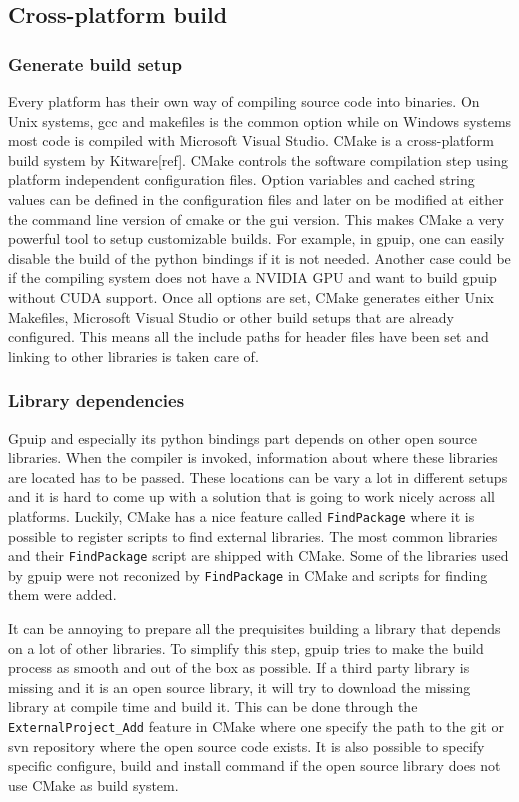 \subsection{Cross-platform build}
\subsubsection{Generate build setup}
Every platform has their own way of compiling source code into binaries. On Unix systems, gcc and makefiles is the common option while on Windows systems most code is compiled with Microsoft Visual Studio. CMake is a cross-platform build system by Kitware[ref]. CMake controls the software compilation step using platform independent configuration files. Option variables and cached string values can be defined in the configuration files and later on be modified at either the command line version of cmake or the gui version. This makes CMake a very powerful tool to setup customizable builds. For example, in gpuip, one can easily disable the build of the python bindings if it is not needed. Another case could be if the compiling system does not have a NVIDIA GPU and want to build gpuip without CUDA support. Once all options are set, CMake generates either Unix Makefiles, Microsoft Visual Studio or other build setups that are already configured. This means all the include paths for header files have been set and linking to other libraries is taken care of.

\subsubsection{Library dependencies}
Gpuip and especially its python bindings part depends on other open source libraries. When the compiler is invoked, information about where these libraries are located has to be passed. These locations can be vary a lot in different setups and it is hard to come up with a solution that is going to work nicely across all platforms. Luckily, CMake has a nice feature called {\tt FindPackage} where it is possible to register scripts to find external libraries. The most common libraries and their {\tt FindPackage} script are shipped with CMake. Some of the libraries used by gpuip were not reconized by {\tt FindPackage} in CMake and scripts for finding them were added.
\newline

It can be annoying to prepare all the prequisites building a library that depends on a lot of other libraries. To simplify this step, gpuip tries to make the build process as smooth and out of the box as possible. If a third party library is missing and it is an open source library, it will try to download the missing library at compile time and build it. This can be done through the {\tt ExternalProject\_Add} feature in CMake where one specify the path to the git or svn repository where the open source code exists. It is also possible to specify specific configure, build and install command if the open source library does not use CMake as build system.

